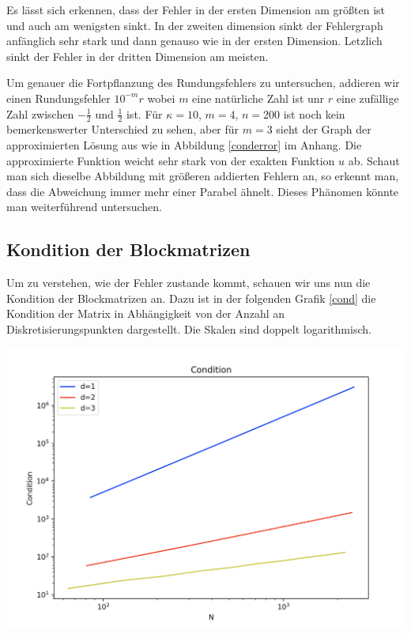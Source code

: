 \documentclass[smallheadings]{scrartcl}
\theoremstyle{definition}
\begin{document}
 Es lässt sich erkennen, dass der Fehler in der ersten Dimension am größten ist und auch am wenigsten sinkt. In der zweiten dimension sinkt der Fehlergraph anfänglich sehr stark und dann genauso wie in der ersten Dimension. Letzlich sinkt der Fehler in der dritten Dimension am meisten. 

Um genauer die Fortpflanzung des Rundungsfehlers zu untersuchen, addieren wir einen Rundungsfehler $10^{-m}r$ wobei $m$ eine natürliche Zahl ist unr $r$ eine zufällige Zahl zwischen $-\frac{1}{2}$ und $\frac{1}{2}$ ist. Für $\kappa =10$, $m=4$, $n=200$ ist noch kein bemerkenswerter Unterschied zu sehen, aber für $m=3$ sieht der Graph der approximierten Lösung aus wie in Abbildung \ref{conderror} im Anhang. 
Die approximierte Funktion weicht sehr stark von der exakten Funktion $u$ ab. Schaut man sich dieselbe Abbildung mit größeren addierten Fehlern an, so erkennt man, dass die Abweichung immer mehr einer Parabel ähnelt. Dieses Phänomen könnte man  weiterführend untersuchen.

\subsection{Kondition der Blockmatrizen}

Um zu verstehen, wie der Fehler zustande kommt, schauen wir uns nun die Kondition der Blockmatrizen an. Dazu ist in der folgenden Grafik \ref{cond} die Kondition der Matrix in Abhängigkeit von der Anzahl an  Diskretisierungspunkten dargestellt. Die Skalen sind doppelt logarithmisch. 


\begin{minipage}{\textwidth}
\centering
\includegraphics[scale = 0.4]{Condition}
    	\label{cond}
\end{minipage}
\end{document}
